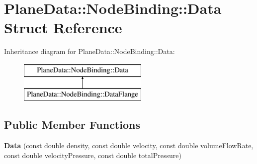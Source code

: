 \hypertarget{struct_plane_data_1_1_node_binding_1_1_data}{}\section{Plane\+Data\+:\+:Node\+Binding\+:\+:Data Struct Reference}
\label{struct_plane_data_1_1_node_binding_1_1_data}
Inheritance diagram for Plane\+Data\+:\+:Node\+Binding\+:\+:Data\+:\begin{figure}[H]
\begin{center}
\leavevmode
\includegraphics[height=2.000000cm]{d8/dbd/struct_plane_data_1_1_node_binding_1_1_data}
\end{center}
\end{figure}
\subsection*{Public Member Functions}
\begin{DoxyCompactItemize}
\item 
\mbox{\label{struct_plane_data_1_1_node_binding_1_1_data_a2a5a91360718fa29928d9604628bf6da}} 
{\bfseries Data} (const double density, const double velocity, const double volume\+Flow\+Rate, const double velocity\+Pressure, const double total\+Pressure)
\end{DoxyCompactItemize}
